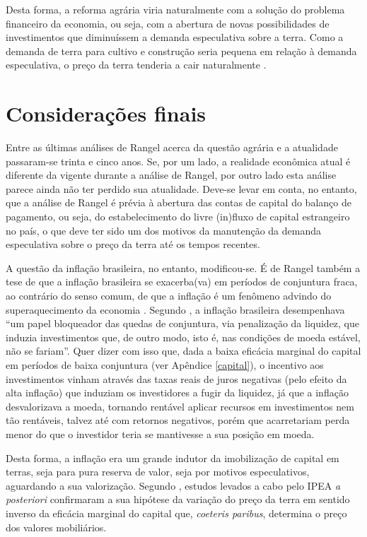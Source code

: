 \documentclass[
	12pt,				%
	oneside,			%
	a4paper,			%
	chapter=TITLE,		%
	section=TITLE,		%
	english,			%
	brazil				%
	]{abntex2}
\begin{document}
\begin{refsection}
Desta forma, a reforma agrária viria naturalmente com a solução do problema
financeiro da economia, ou seja, com a abertura de novas possibilidades de
investimentos que diminuíssem a demanda especulativa sobre a terra. Como a
demanda de terra para cultivo e construção seria pequena em relação à demanda
especulativa, o preço da terra tenderia a cair naturalmente \autocite[139]{rangel1986b}.

\hypertarget{considerauxe7uxf5es-finais}{%
\section{Considerações finais}\label{considerauxe7uxf5es-finais}}

Entre as últimas análises de Rangel acerca da questão agrária e a atualidade
passaram-se trinta e cinco anos. Se, por um lado, a realidade econômica atual é
diferente da vigente durante a análise de Rangel, por outro lado esta análise
parece ainda não ter perdido sua atualidade. Deve-se levar em conta, no entanto,
que a análise de Rangel é prévia à abertura das contas de capital do balanço de pagamento, ou seja, do estabelecimento do livre
(in)fluxo de capital estrangeiro no país, o que deve
ter sido um dos motivos da manutenção da demanda especulativa sobre o preço da
terra até os tempos recentes.

A questão da inflação brasileira, no entanto, modificou-se. É de Rangel também a
tese de que a inflação brasileira se exacerba(va) em períodos de conjuntura
fraca, ao contrário do senso comum, de que a inflação é um fenômeno advindo do
superaquecimento da economia \autocite{inflacao-brasileira}. Segundo \textcite{rangel}, a inflação
brasileira desempenhava ``um papel bloqueador das quedas de conjuntura, via
penalização da liquidez, que induzia investimentos que, de outro modo, isto é,
nas condições de moeda estável, não se fariam''. Quer dizer com isso que, dada a
baixa eficácia marginal do capital em períodos de baixa conjuntura (ver Apêndice
\ref{capital}), o incentivo aos investimentos vinham através das taxas reais de
juros negativas (pelo efeito da alta inflação) que induziam os investidores a
fugir da liquidez, já que a inflação desvalorizava a moeda, tornando rentável
aplicar recursos em investimentos nem tão rentáveis, talvez até com retornos
negativos, porém que acarretariam perda menor do que o investidor teria se
mantivesse a sua posição em moeda.

Desta forma, a inflação era um grande indutor da imobilização
de capital em terras, seja para pura reserva de
valor, seja por motivos especulativos, aguardando a sua valorização. Segundo
\textcite[p.~139]{rangel1986b}, estudos levados a cabo pelo IPEA \emph{a posteriori}
confirmaram a sua hipótese da variação do preço da terra em sentido inverso da
eficácia marginal do capital que, \emph{coeteris
paribus}, determina o preço dos valores mobiliários.


\end{refsection}
\end{document}
